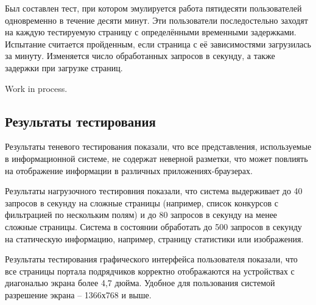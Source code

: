 Был составлен тест, при котором эмулируется работа пятидесяти пользователей одновременно в течение десяти минут.
Эти пользователи последостельно заходят на каждую тестируемую страницу с определёнными временными задержками.
Испытание считается пройденным, если страница с её зависимостями загрузилась за минуту.
Изменяется число обработанных запросов в секунду, а также задержки при загрузке страниц.

Work in process.

\subsection{Результаты тестирования}

Результаты теневого тестирования показали, что все представления, используемые в информационной системе, не содержат неверной разметки, что может повлиять на отображение информации в различных приложениях-браузерах.

Результаты нагрузочного тестировния показали, что система выдерживает до 40 запросов в секунду на сложные страницы (например, список конкурсов с фильтрацией по нескольким полям) и до 80 запросов в секунду на менее сложные страницы.
Система в состоянии обработать до 500 запросов в секунду на статическую информацию, например, страницу статистики или изображения.

Результаты тестирования графического интерфейса пользователя показали, что все страницы портала подрядчиков корректно отображаются на устройствах с диагональю экрана более 4,7 дюйма.
Удобное для пользования системой разрешение экрана -- 1366х768 и выше.

\clearpage
\newpage